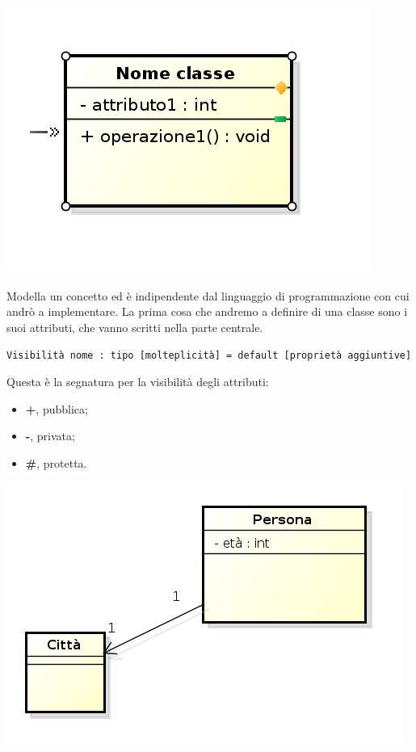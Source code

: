 \begin{center}

\includegraphics[width=0.75\columnwidth]{img6} %

\end{center}

Modella un concetto ed è indipendente dal linguaggio di programmazione con cui andrò a implementare. La prima cosa che andremo a definire di una classe sono i suoi attributi, che vanno scritti nella parte centrale.

\begin{center}

\texttt{Visibilità nome : tipo [molteplicità] = default [proprietà aggiuntive]}

\end{center}

Questa è la segnatura per la visibilità degli attributi:

\begin{itemize}

	\item \textbf{+}, pubblica;
	\item \textbf{-}, privata;
	\item \textbf{\#}, protetta.

\end{itemize}

\begin{center}

\includegraphics[width=0.75\columnwidth]{img7} %

\end{center}

